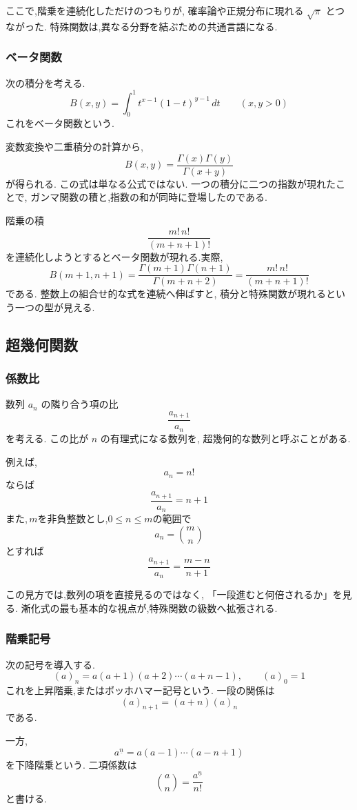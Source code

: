 ここで,階乗を連続化しただけのつもりが,
確率論や正規分布に現れる $\sqrt{\pi}$ とつながった.
特殊関数は,異なる分野を結ぶための共通言語になる.

\subsubsection{ベータ関数}

次の積分を考える.
\[
  B(x,y)=\int_0^1 t^{x-1}(1-t)^{y-1}\,dt
  \qquad (x,y>0)
\]
これをベータ関数という.

変数変換や二重積分の計算から,
\[
  B(x,y)=\frac{\Gamma(x)\Gamma(y)}{\Gamma(x+y)}
\]
が得られる.
この式は単なる公式ではない.
一つの積分に二つの指数が現れたことで,
ガンマ関数の積と,指数の和が同時に登場したのである.

階乗の積
\[
  \frac{m!\,n!}{(m+n+1)!}
\]
を連続化しようとするとベータ関数が現れる.実際,
\[
  B(m+1,n+1)=\frac{\Gamma(m+1)\Gamma(n+1)}{\Gamma(m+n+2)}=\frac{m!\,n!}{(m+n+1)!}
\]
である.
整数上の組合せ的な式を連続へ伸ばすと,
積分と特殊関数が現れるという一つの型が見える.

\subsection{超幾何関数}

\subsubsection{係数比}

数列 $a_n$ の隣り合う項の比
\[
  \frac{a_{n+1}}{a_n}
\]
を考える.
この比が $n$ の有理式になる数列を,
超幾何的な数列と呼ぶことがある.

例えば,
\[
  a_n=n!
\]
ならば
\[
  \frac{a_{n+1}}{a_n}=n+1
\]
また,\,$m$を非負整数とし,$0\le n\le m$の範囲で
\[
  a_n=\binom{m}{n}
\]
とすれば
\[
  \frac{a_{n+1}}{a_n}
  =\frac{m-n}{n+1}
\]

この見方では,数列の項を直接見るのではなく,
「一段進むと何倍されるか」を見る.
漸化式の最も基本的な視点が,特殊関数の級数へ拡張される.

\subsubsection{階乗記号}

次の記号を導入する.
\[
  (a)_n=a(a+1)(a+2)\cdots(a+n-1),
  \qquad (a)_0=1
\]
これを上昇階乗,またはポッホハマー記号という.
一段の関係は
\[
  (a)_{n+1}=(a+n)(a)_n
\]
である.

一方,
\[
  a^{\underline n}
  =a(a-1)\cdots(a-n+1)
\]
を下降階乗という.
二項係数は
\[
  \binom{a}{n}
  =\frac{a^{\underline n}}{n!}
\]
と書ける.

